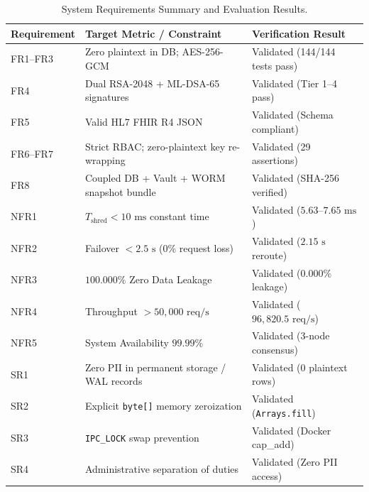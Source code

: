 \begin{table}[htbp]
\centering
\small
\caption{System Requirements Summary and Evaluation Results.}
\label{tab:requirements-summary}
\begin{tabular}{lll}
\toprule
\textbf{Requirement} & \textbf{Target Metric / Constraint} & \textbf{Verification Result} \\
\midrule
FR1--FR3 & Zero plaintext in DB; AES-256-GCM & Validated (144/144 tests pass) \\
FR4 & Dual RSA-2048 + ML-DSA-65 signatures & Validated (Tier 1--4 pass) \\
FR5 & Valid HL7 FHIR R4 JSON & Validated (Schema compliant) \\
FR6--FR7 & Strict RBAC; zero-plaintext key re-wrapping & Validated (29 assertions) \\
FR8 & Coupled DB + Vault + WORM snapshot bundle & Validated (SHA-256 verified) \\
\midrule
NFR1 & $T_{\text{shred}} < 10\text{~ms}$ constant time & Validated ($5.63\text{--}7.65\text{~ms}$) \\
NFR2 & Failover $< 2.5\text{~s}$ (0\% request loss) & Validated ($2.15\text{~s}$ reroute) \\
NFR3 & $100.000\%$ Zero Data Leakage & Validated ($0.000\%$ leakage) \\
NFR4 & Throughput $> 50{,}000\text{~req/s}$ & Validated ($96{,}820.5\text{~req/s}$) \\
NFR5 & System Availability $99.99\%$ & Validated (3-node consensus) \\
\midrule
SR1 & Zero PII in permanent storage / WAL records & Validated (0 plaintext rows) \\
SR2 & Explicit \texttt{byte[]} memory zeroization & Validated (\texttt{Arrays.fill}) \\
SR3 & \texttt{IPC\_LOCK} swap prevention & Validated (Docker cap\_add) \\
SR4 & Administrative separation of duties & Validated (Zero PII access) \\
\bottomrule
\end{tabular}
\end{table}
